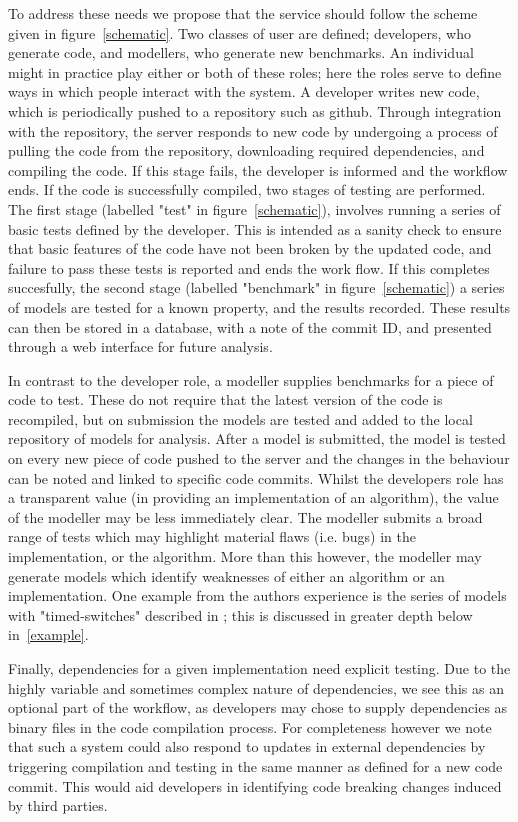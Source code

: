 \documentclass{llncs}
\begin{document}
To address these needs we propose that the service should follow the scheme given in 
figure~\ref{schematic}. Two classes of user are defined; developers, who generate code, 
and modellers, who generate new benchmarks. An individual might in practice play either
or both of these roles; here the roles serve to define ways in which people interact with
the system. A developer writes new code, which is periodically pushed to a repository 
such as github. Through integration with the repository, the server responds to new 
code by undergoing a process of pulling the code from the repository, downloading 
required dependencies, and compiling the code. If this stage fails, the developer is 
informed and the workflow ends. If the code is successfully compiled, two stages of 
testing are performed. The first stage (labelled "test" in figure~\ref{schematic}), involves
running a series of basic tests defined by the developer. This is intended as a sanity check 
to ensure that basic features of the code have not been broken by the updated code, and 
failure to pass these tests is reported and ends the work flow. If this completes succesfully,
the second stage (labelled "benchmark" in figure~\ref{schematic}) a series of models are 
tested for a known property, and the results recorded. These results can then be stored
in a database, with a note of the commit ID, and presented through a web interface for 
future analysis. 

In contrast to the developer role, a modeller supplies benchmarks for a piece of code 
to test. These do not require that the latest version of the code is recompiled, but 
on submission the models are tested and added to the local repository of models for
analysis. After a model is submitted, the model is tested on every new piece of code
pushed to the server and the changes in the behaviour can be noted and linked to 
specific code commits. Whilst the developers role has a transparent value (in 
providing an implementation of an algorithm), the value of the modeller may be less 
immediately clear. The modeller submits a broad range of tests which may highlight
material flaws (i.e. bugs) in the implementation, or the algorithm. More than this
however, the modeller may generate models which identify weaknesses of either an
algorithm or an implementation. One example from the authors experience is the 
series of models with "timed-switches" described in \cite{cav14}; this is discussed 
in greater depth below in~\ref{example}.

Finally, dependencies for a given implementation need explicit testing. Due to the
highly variable and sometimes complex nature of dependencies, we see this as an
optional part of the workflow, as developers may chose to supply dependencies as
binary files in the code compilation process. For completeness however we note that 
such a system could also respond to updates in external dependencies by triggering 
compilation and testing in the same manner as defined for a new code commit. This 
would aid developers in identifying code breaking changes induced by third parties.
\end{document}
